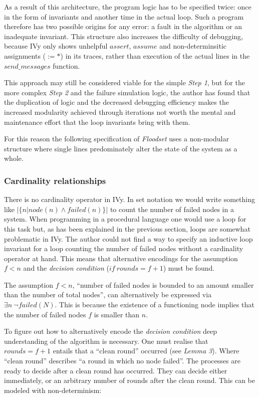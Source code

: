 \documentclass[fleqn]{article}
\begin{document}
As a result of this architecture, the program logic has to be specified twice: once in the form of invariants and another time in the actual loop. Such a program therefore has two possible origins for any error: a fault in the algorithm or an inadequate invariant. This structure also increases the difficulty of debugging, because IVy only shows unhelpful $assert$, $assume$ and  non-determinsitic assignments ($:= *$) in its traces, rather than execution of the actual lines in the $send\_messages$ function.

This approach may still be considered viable for the simple \textit{Step 1}, but for the more complex \textit{Step 2} and the failure simulation logic, the author has found that the duplication of logic and the decreased debugging efficiency makes the increased modularity achieved through iterations not worth the mental and maintenance effort that the loop invariants bring with them.

For this reason the following specification of \textit{Floodset} uses a non-modular structure where single lines predominately alter the state of the system as a whole.


\subsubsection{Cardinality relationships}
There is no cardinality operator in IVy. In set notation we would write something like $|\{n|node(n) \land failed(n)\}|$ to count the number of failed nodes in a system. When programming in a procedural language one would use a loop for this task but, as has been explained in the previous section, loops are somewhat problematic in IVy. The author could not find a way to specify an inductive loop invariant for a loop counting the number of failed nodes without a cardinality operator at hand. This means that alternative encodings for the assumption $f<n$ and the \textit{decision condition} ($if\ rounds = f+1$) must be found.

The assumption $f<n$, ``number of failed nodes is bounded to an amount smaller than the number of total nodes'', can alternatively be expressed via $\exists n\ \neg failed(N)$. This is because the existence of a functioning node implies that the number of failed nodes $f$ is smaller than $n$.

To figure out how to alternatively encode the \textit{decision condition} deep understanding of the algorithm is necessary. One must realise that $rounds = f+1$ entails that a ``clean round'' occurred (see \textit{Lemma 3}). Where ``clean round'' describes ``a round in which no node failed''. The processes are ready to decide after a clean round has occurred. They can decide either immediately, or an arbitrary number of rounds after the clean round. This can be modeled with non-determinism:
\end{document}
